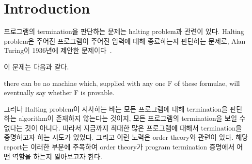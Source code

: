 \section{Introduction}
\label{sec:preliminaries}
프로그램의 termination을 판단하는 문제는 halting problem과 관련이 있다.
Halting problem은 주어진 프로그램이 주어진 입력에 대해 종료하는지 판단하는 문제로, Alan Turing이 1936년에 제안한 문제이다~\cite{turing}.

이 문제는 다음과 같다.
\begin{theorem}
    there can be no machine which, supplied with any one
F of these formulae, will eventually say whether F is provable.
\end{theorem}

그러나 Halting problem이 시사하는 바는 모든 프로그램에 대해 termination을 판단하는 algorithm이 존재하지 않는다는 것이지, 모든 프로그램의 termination을 보일 수 없다는 것이 아니다.
따라서 지금까지 최대한 많은 프로그램에 대해서 termination을 증명하고자 하는 시도가 있었다.
그리고 이런 노력은 order theory와 관련이 있다.
해당 report는 이러한 부분에 주목하여 order theory가 program termination 증명에서 어떤 역할을 하는지 알아보고자 한다.